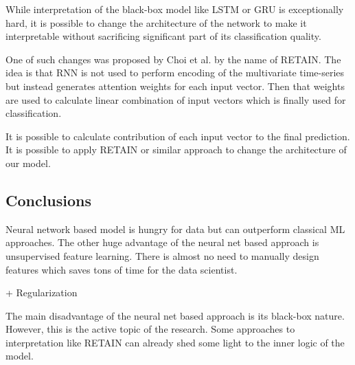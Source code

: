 \documentclass{sigkddExp}
\begin{document}
While interpretation of the black-box model like LSTM or GRU is exceptionally hard, it is possible to change the architecture of the network to make it interpretable without sacrificing significant part of its classification quality.

One of such changes was proposed by Choi et al.\cite{DBLP:journals/corr/ChoiBSSS16} by the name of RETAIN. The idea is that RNN is not used to perform encoding of the multivariate time-series but instead generates attention weights for each input vector. Then that weights are used to calculate linear combination of input vectors which is finally used for classification.

It is possible to calculate contribution of each input vector to the final prediction. It is possible to apply RETAIN or similar approach to change the architecture of our model.

\subsection{Conclusions}

Neural network based model is hungry for data but can outperform classical ML approaches. The other huge advantage of the neural net based approach is unsupervised feature learning. There is almost no need to manually design features which saves tons of time for the data scientist.

+ Regularization 

The main disadvantage of the neural net based approach is its black-box nature. However, this is the active topic of the research. Some approaches to interpretation like RETAIN can already shed some light to the inner logic of the model.



\end{document}
